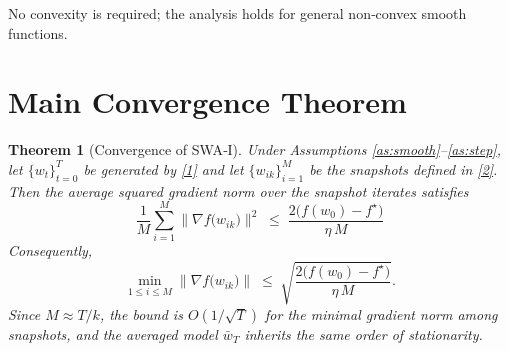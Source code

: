\documentclass{article}
\newtheorem{theorem}{Theorem}
\begin{document}
No convexity is required; the analysis holds for general non‑convex smooth
functions.

\section*{Main Convergence Theorem}
\begin{theorem}[Convergence of SWA‑I]\label{thm:main}
Under Assumptions \ref{as:smooth}–\ref{as:step}, let $\{w_{t}\}_{t=0}^{T}$
be generated by \eqref{1} and let $\{w_{i k}\}_{i=1}^{M}$ be the
snapshots defined in \eqref{2}.  Then the average squared gradient norm
over the snapshot iterates satisfies
\[
\boxed{\;
\frac{1}{M}\sum_{i=1}^{M}\bigl\|\nabla f\!\bigl(w_{i k}\bigr)\bigr\|^{2}
\;\le\;
\frac{2\bigl(f(w_{0})-f^{\star}\bigr)}{\eta\,M}
\;}
\tag{5}
\]
Consequently,
\[
\min_{1\le i\le M}\bigl\|\nabla f\!\bigl(w_{i k}\bigr)\bigr\|
\;\le\;
\sqrt{\frac{2\bigl(f(w_{0})-f^{\star}\bigr)}{\eta\,M}}.
\tag{6}
\]
Since $M\approx T/k$, the bound is $O(1/\sqrt{T})$ for the minimal
gradient norm among snapshots, and the averaged model $\bar w_{T}$ inherits
the same order of stationarity.
\end{theorem}

\end{document}
